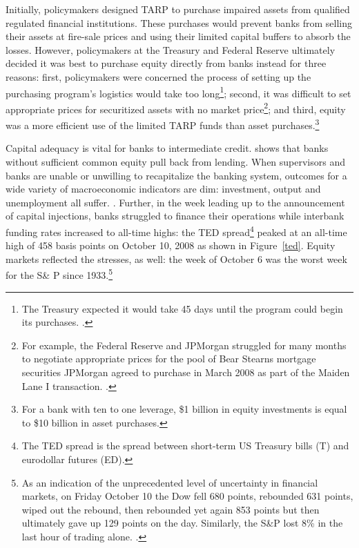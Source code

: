 \documentclass[12pt]{article}
\begin{document}
Initially, policymakers designed TARP to purchase impaired assets from qualified regulated financial institutions. These purchases would prevent banks from selling their assets at fire-sale prices and using their limited capital buffers to absorb the losses. However, policymakers at the Treasury and Federal Reserve ultimately decided it was best to purchase equity directly from banks instead for three reasons: first, policymakers were concerned the process of setting up the purchasing program's logistics would take too long\footnote{The Treasury expected it would take 45 days until the program could begin its purchases. \citep{Geithner}.}; second, it was difficult to set appropriate prices for securitized assets with no market price\footnote{For example, the Federal Reserve and JPMorgan struggled for many months to negotiate appropriate prices for the pool of Bear Stearns mortgage securities JPMorgan agreed to purchase in March 2008 as part of the Maiden Lane I transaction. \citep{Geithner}.}; and third, equity was a more efficient use of the limited TARP funds than asset purchases.\footnote{For a bank with ten to one leverage, \$1 billion in equity investments is equal to \$10 billion in asset purchases.}

Capital adequacy is vital for banks to intermediate credit. \citet{Peek} shows that banks without sufficient common equity pull back from lending. When supervisors and banks are unable or unwilling to recapitalize the banking system, outcomes for a wide variety of macroeconomic indicators are dim: investment, output and unemployment all suffer. \citep{Hoshi}. Further, in the week leading up to the announcement of capital injections, banks struggled to finance their operations while interbank funding rates increased to all-time highs: the TED spread\footnote{The TED spread is the spread between short-term US Treasury bills (T) and eurodollar futures (ED).} peaked at an all-time high of 458 basis points on October 10, 2008 as shown in Figure~\ref{ted}. Equity markets reflected the stresses, as well: the week of October 6 was the worst week for the S\& P since 1933.\footnote{As an indication of the unprecedented level of uncertainty in financial markets, on Friday October 10 the Dow fell 680 points, rebounded 631 points, wiped out the rebound, then rebounded yet again 853 points but then ultimately gave up 129 points on the day. Similarly, the S\&P lost 8\% in the last hour of trading alone. \citep{paulsonbook}.} 
\end{document}
